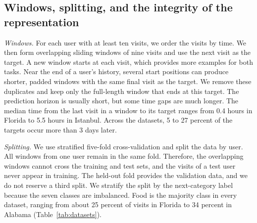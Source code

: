 \subsection{Windows, splitting, and the integrity of the representation}
\label{sec:setup-windows}
\emph{Windows.} For each user with at least ten visits, we order the visits by time. We then form overlapping sliding windows of nine visits and use the next visit as the target. A new window starts at each visit, which provides more examples for both tasks. Near the end of a user's history, several start positions can produce shorter, padded windows with the same final visit as the target. We remove these duplicates and keep only the full-length window that ends at this target. The prediction horizon is usually short, but some time gaps are much longer. The median time from the last visit in a window to its target ranges from 0.4 hours in Florida to 5.5 hours in Istanbul. Across the datasets, 5 to 27 percent of the targets occur more than 3 days later.

\emph{Splitting.} We use stratified five-fold cross-validation and split the data by user. All windows from one user remain in the same fold. Therefore, the overlapping windows cannot cross the training and test sets, and the visits of a test user never appear in training. The held-out fold provides the validation data, and we do not reserve a third split. We stratify the split by the next-category label because the seven classes are imbalanced. Food is the majority class in every dataset, ranging from about 25 percent of visits in Florida to 34 percent in Alabama (Table~\ref{tab:datasets}).

